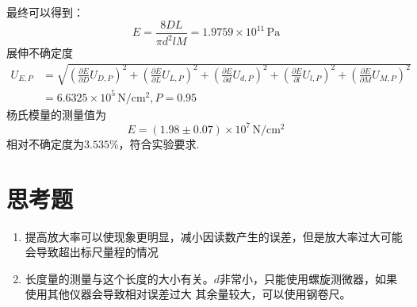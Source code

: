 \documentclass[UTF8]{ctexart}
\begin{document}
\noindent 最终可以得到：
\[E=\frac{8 D L}{\pi d^{2} l M}=1.9759 \times 10^{11}\,\mathrm{Pa}\]
展伸不确定度
\[
\begin{aligned}
    U_{E,P}&=\sqrt{\left(\frac{\partial E}{\partial D}U_{D,P}\right)^2+\left(\frac{\partial E}{\partial L}U_{L,P}\right)^2+\left(\frac{\partial E}{\partial d}U_{d,P}\right)^2+\left(\frac{\partial E}{\partial l}U_{l,P}\right)^2+\left(\frac{\partial E}{\partial M}U_{M,P}\right)^2}\\
    &=6.6325 \times 10^{5}\,\mathrm{N/cm^2},P=0.95
\end{aligned}
\]
杨氏模量的测量值为
\[E=\left(1.98 \pm 0.07\right) \times 10^{7}\,\mathrm{N/cm^2}\]
相对不确定度为$3.535\%$，符合实验要求.
\section{思考题}
\begin{enumerate}
    \item 提高放大率可以使现象更明显，减小因读数产生的误差，但是放大率过大可能会导致超出标尺量程的情况
    \item 长度量的测量与这个长度的大小有关。$d$非常小，只能使用螺旋测微器，如果使用其他仪器会导致相对误差过大
    其余量较大，可以使用钢卷尺。
\end{enumerate}



\end{document}
